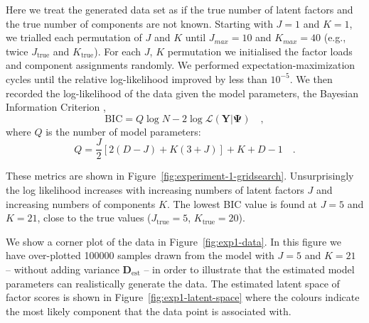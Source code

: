 \documentclass[twocolumn]{aastex62}
\newcommand{\todo}[1]{\textcolor{red}{#1}}
\newcommand{\vect}[1]{\boldsymbol{\mathbf{#1}}}
\renewcommand{\vec}[1]{\vect{#1}}
\newcommand{\data}{\textbf{Y}}
\newcommand{\specificvariance}{\vec{D}}
\newcommand{\NumDimensions}{D}
\newcommand{\NumLatentFactors}{J}
\newcommand{\NumComponents}{K}
\begin{document}

Here we treat the generated data set as if the true number of latent factors
and the true number of components are not known. Starting with $\NumLatentFactors = 1$
and $\NumComponents = 1$, we trialled each permutation of $\NumLatentFactors$ and $\NumComponents$
until $\NumLatentFactors_{max} = 10$
and   $\NumComponents_{max} = 40$ (e.g., twice $\NumLatentFactors_\textrm{true}$ and $\NumComponents_\textrm{true}$).
For each $\NumLatentFactors$, $\NumComponents$ permutation we initialised the factor
loads and component assignments randomly. We performed expectation-maximization 
cycles until the relative log-likelihood improved by less than $10^{-5}$. We then
recorded the log-likelihood of the data given the model parameters, the
Bayesian Information Criterion \citep[BIC;][]{Schwarz:1978}, 
\begin{equation}
	\textrm{BIC} = Q\log{N} - 2\log\mathcal{L}\left(\data|\vec\Psi\right) \quad , \label{eq:bic}
\end{equation} 
\noindent{}where $Q$ is the number of model parameters:
\begin{equation}
	Q = \frac{\NumLatentFactors}{2}\left[2\left(\NumDimensions - \NumLatentFactors\right) + \NumComponents\left(3 + \NumLatentFactors\right)\right] + \NumComponents + \NumDimensions - 1 \quad .
\end{equation}

These metrics are shown in Figure~\ref{fig:experiment-1-gridsearch}.
Unsurprisingly the log likelihood increases with increasing numbers of latent
factors $\NumLatentFactors$ and increasing numbers of components $\NumComponents$.
The lowest BIC value is found at $\NumLatentFactors = 5$
and $\NumComponents = 21$, close to the true values ($\NumLatentFactors_\textrm{true} = 5$,
$\NumComponents_\textrm{true} = 20$). 

We show a corner plot of the data in Figure~\ref{fig:exp1-data}.
In this figure we have over-plotted 100000 samples drawn from the model
with $J = 5$ and $K = 21$
-- without adding variance $\specificvariance_\textrm{est}$
-- in order to illustrate that the
estimated model parameters can realistically generate the data.
The estimated latent space of factor scores is shown in 
Figure~\ref{fig:exp1-latent-space} where the colours indicate the
most likely component that the data point is associated with.
\end{document}
